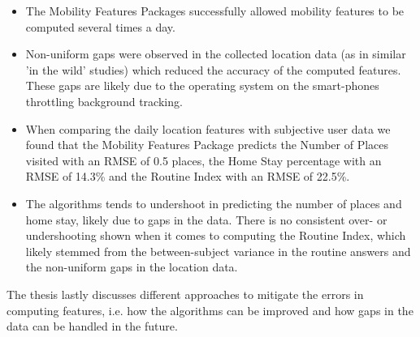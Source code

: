 \begin{itemize}
    \item The Mobility Features Packages successfully allowed mobility features to be computed several times a day.
    
    \item Non-uniform gaps were observed in the collected location data (as in similar 'in the wild' studies) which reduced the accuracy of the computed features. These gaps are likely due to the operating system on the smart-phones throttling background tracking.
    
    \item When comparing the daily location features with subjective user data we found that the Mobility Features Package predicts the Number of Places visited with an RMSE of 0.5 places, the Home Stay percentage with an RMSE of 14.3\% and the Routine Index with an RMSE of 22.5\%.
    
    \item The algorithms tends to undershoot in predicting the number of places and home stay, likely due to gaps in the data. There is no consistent over- or undershooting shown when it comes to computing the Routine Index, which likely stemmed from the between-subject variance in the routine answers and the non-uniform gaps in the location data.
\end{itemize}

The thesis lastly  discusses different approaches to mitigate the errors in computing features, i.e. how the algorithms can be improved and how gaps in the data can be handled in the future. 